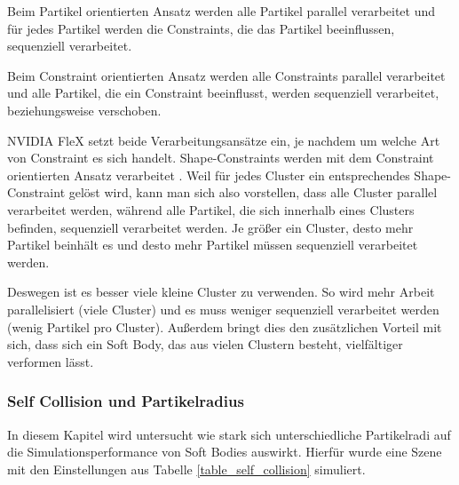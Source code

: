 Beim Partikel orientierten Ansatz werden alle Partikel parallel verarbeitet und für jedes Partikel werden die Constraints, die das Partikel beeinflussen, sequenziell verarbeitet. 

Beim Constraint orientierten Ansatz werden alle Constraints parallel verarbeitet und alle Partikel, die ein Constraint beeinflusst, werden sequenziell verarbeitet, beziehungsweise verschoben. 

NVIDIA FleX setzt beide Verarbeitungsansätze ein, je nachdem um welche Art von Constraint es sich handelt. Shape-Constraints werden mit dem Constraint orientierten Ansatz verarbeitet \cite{FlexD3D}. Weil für jedes Cluster ein entsprechendes Shape-Constraint gelöst wird, kann man sich also vorstellen, dass alle Cluster parallel verarbeitet werden, während alle Partikel, die sich innerhalb eines Clusters befinden, sequenziell verarbeitet werden. Je größer ein Cluster, desto mehr Partikel beinhält es und desto mehr Partikel müssen sequenziell verarbeitet werden. 

Deswegen ist es besser viele kleine Cluster zu verwenden. So wird mehr Arbeit parallelisiert (viele Cluster) und es muss weniger sequenziell verarbeitet werden (wenig Partikel pro Cluster). Außerdem bringt dies den zusätzlichen Vorteil mit sich, dass sich ein Soft Body, das aus vielen Clustern besteht, vielfältiger verformen lässt.



\subsubsection{Self Collision und Partikelradius}


In diesem Kapitel wird untersucht wie stark sich unterschiedliche Partikelradi auf die Simulationsperformance von Soft Bodies auswirkt. Hierfür wurde eine Szene mit den Einstellungen aus Tabelle \ref{table_self_collision} simuliert. 

